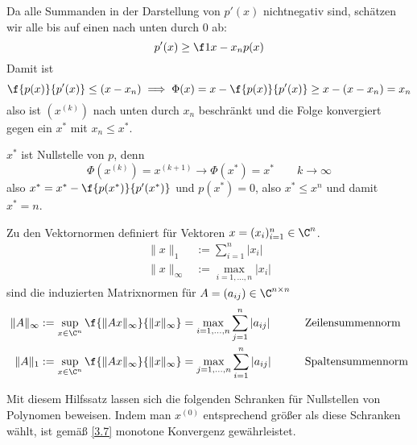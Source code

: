\documentclass[11pt]{scrartcl}
\begin{document}
\begin{st}
\begin{note}
		Da alle Summanden in der Darstellung von $p'(x)$ nichtnegativ sind, schätzen wir alle bis auf einen nach unten durch $0$ ab:
		\[
			p'(x) \ge \f 1{x-x_n}p(x)
		\]
		Damit ist
		\[
			\f {p(x)}{p'(x)} \le (x-x_n)
			\implies
			\Phi(x) = x - \f {p(x)}{p'(x)} \ge x-(x-x_n) = x_n
		\]
		also ist $(x^{(k)})$ nach unten durch $x_n$ beschränkt und die Folge konvergiert gegen ein $x^*$ mit $x_n \le x^*$.

		$x^*$ ist Nullstelle von $p$, denn
		\[
			\Phi(x^{(k)}) = x^{(k+1)}
			\to
			\Phi(x^*) = x^*
			\qquad k\to\infty
		\]
		also $x^* = x^* - \f {p(x^*)}{p'(x^*)}$ und $p(x^*) = 0$, also $x^* \le x^n$ und damit $x^*=n$.
	\end{note}
\end{st}

\begin{st} \label{3.8}
	Zu den Vektornormen definiert für Vektoren $x=(x_i)_{i=1}^n \in \C^n$.
	\begin{align*}
		\|x\|_1 &:= \sum_{i=1}^n |x_i| \\
		\|x\|_\infty &:= \max_{i = 1,\dotsc,n} |x_i|
	\end{align*}
	sind die induzierten Matrixnormen für $A=(a_{ij}) \in \C^{n\times n}$
	\begin{alignat*}{3}
		\|A\|_\infty &:= \sup_{x\in \C^n} \f{\|Ax\|_\infty}{\|x\|_\infty} = \max_{i=1,\dotsc,n} \sum_{j=1}^n |a_{ij}| &
			& \qquad\text{Zeilensummennorm} \\
		\|A\|_1 &:= \sup_{x\in \C^n} \f{\|Ax\|_\infty}{\|x\|_\infty} = \max_{j=1,\dotsc,n} \sum_{i=1}^n |a_{ij}| &
			& \qquad\text{Spaltensummennorm}
	\end{alignat*}
\end{st}

Mit diesem Hilfssatz lassen sich die folgenden Schranken für Nullstellen von Polynomen beweisen.
Indem man $x^{(0)}$ entsprechend größer als diese Schranken wählt, ist gemäß \ref{3.7} monotone Konvergenz gewährleistet.
\end{document}
